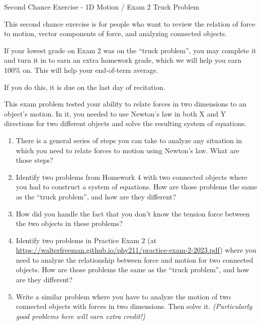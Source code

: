 \documentclass[12pt]{article}
\begin{document}
\begin{center}
\Large
\sc Second Chance Exercise - 1D Motion / Exam 2 Truck Problem \rm





\normalsize
This second chance exercise is for people who want to review the relation of force to motion, vector components of force, and analyzing connected objects.

If your lowest grade on Exam 2 was on the ``truck problem'', you may complete it and turn it in to earn an extra homework grade, which we will help you earn 100\% on. This will help your end-of-term average.

If you do this, it is due on the last day of recitation.

\end{center}

\vspace{1.5in}

This exam problem tested your ability to relate forces in two dimensions to an object's motion. In it, you needed to use Newton's law in both X and Y directions for two different objects and solve the resulting system of equations.

\begin{enumerate}
	
		\item There is a general series of steps you can take to analyze any situation in which you need to relate forces to motion using Newton's law. What are those steps?
	
		\item Identify two problems from Homework 4 with two connected objects where you had to construct a system of equations. How are those problems the same as the ``truck problem'', and how are they different?
		
	\item How did you handle the fact that you don't know the tension force between the two objects in these problems?

	\item Identify two problems in Practice Exam 2 (at \url{https://walterfreeman.github.io/phy211/practice-exam-2-2023.pdf}) where you need to analyze the relationship between force and motion for two connected objects. How are those problems the same as the ``truck problem'', and how are they different?
	

	
    \item Write a similar problem where you have to analyze the motion of two connected objects with forces in two dimensions. Then solve it. {\it (Particularly good problems here will earn extra credit!)}
\end{enumerate}
\end{document}
